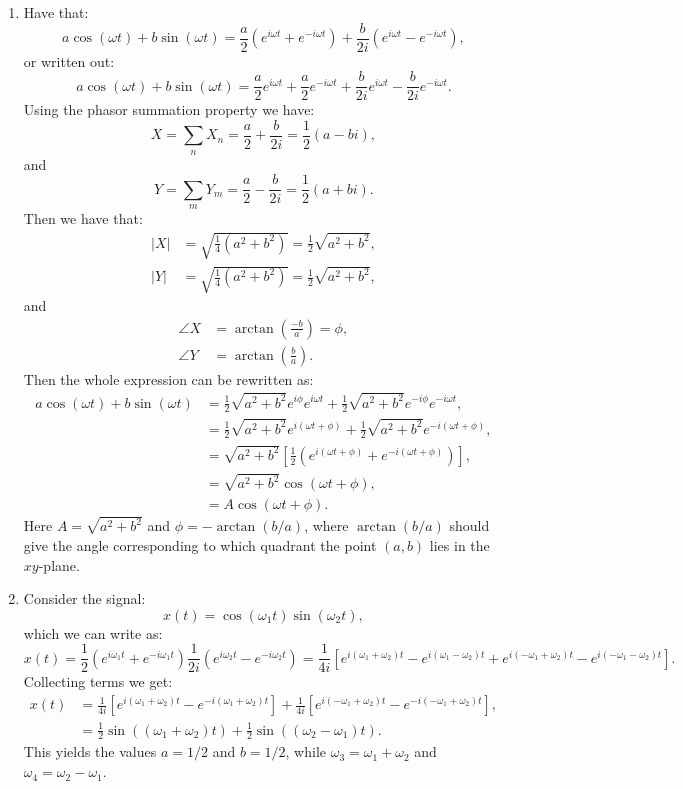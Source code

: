\begin{enumerate}
\item Have that:
$$a\cos(\omega t)+b\sin(\omega t)=\frac{a}{2}(e^{i\omega t}+e^{-i\omega t})+\frac{b}{2i}(e^{i\omega t}-e^{-i\omega t}),$$
or written out:
$$a\cos(\omega t)+b\sin(\omega t)=\frac{a}{2}e^{i\omega t}+\frac{a}{2}e^{-i\omega t}+\frac{b}{2i}e^{i\omega t}-\frac{b}{2i}e^{-i\omega t}.$$
Using the phasor summation property we have:
$$X=\sum_{n}X_{n}=\frac{a}{2}+\frac{b}{2i}=\frac{1}{2}(a-bi),$$
and
$$Y=\sum_{m}Y_{m}=\frac{a}{2}-\frac{b}{2i}=\frac{1}{2}(a+bi).$$
Then we have that:
\begin{align*}
    |X|&=\sqrt{\frac{1}{4}(a^{2}+b^{2})}=\frac{1}{2}\sqrt{a^{2}+b^{2}}, \\
    |Y|&=\sqrt{\frac{1}{4}(a^{2}+b^{2})}=\frac{1}{2}\sqrt{a^{2}+b^{2}},
\end{align*}
and
\begin{align*}
    \angle X&=\arctan\left(\frac{-b}{a}\right)=\phi, \\
    \angle Y&=\arctan\left(\frac{b}{a}\right).
\end{align*}
Then the whole expression can be rewritten as:
\begin{align*}
    a\cos(\omega t)+b\sin(\omega t)&=\frac{1}{2}\sqrt{a^{2}+b^{2}}e^{i\phi}e^{i\omega t}+\frac{1}{2}\sqrt{a^{2}+b^{2}}e^{-i\phi}e^{-i\omega t}, \\
    &=\frac{1}{2}\sqrt{a^{2}+b^{2}}e^{i(\omega t+\phi)}+\frac{1}{2}\sqrt{a^{2}+b^{2}}e^{-i(\omega t+\phi)}, \\
    &=\sqrt{a^{2}+b^{2}}\left[\frac{1}{2}\left(e^{i(\omega t+\phi)}+e^{-i(\omega t+\phi)}\right)\right], \\
    &=\sqrt{a^{2}+b^{2}}\cos(\omega t+\phi), \\
    &=A\cos(\omega t+\phi).
\end{align*}
Here $A=\sqrt{a^{2}+b^{2}}$ and $\phi=-\arctan(b/a)$, where $\arctan(b/a)$ 
should give the angle corresponding to which quadrant the point $(a,b)$ lies in the $xy$-plane. 

\item Consider the signal:
$$x(t)=\cos(\omega_{1}t)\sin(\omega_{2}t),$$
which we can write as:
$$x(t)=\frac{1}{2}(e^{i\omega_{1}t}+e^{-i\omega_{1} t})\frac{1}{2i}(e^{i\omega_{2}t}-e^{-i\omega_{2}t})=\frac{1}{4i}[e^{i(\omega_{1}+\omega_{2})t}-e^{i(\omega_{1}-\omega_{2})t}+e^{i(-\omega_{1}+\omega_{2})t}-e^{i(-\omega_{1}-\omega_{2})t}].$$
Collecting terms we get:
\begin{align*}
    x(t)&=\frac{1}{4i}[e^{i(\omega_{1}+\omega_{2})t}-e^{-i(\omega_{1}+\omega_{2})t}]+\frac{1}{4i}[e^{i(-\omega_{1}+\omega_{2})t}-e^{-i(-\omega_{1}+\omega_{2})t}], \\
    &=\frac{1}{2}\sin((\omega_{1}+\omega_{2})t)+\frac{1}{2}\sin((\omega_{2}-\omega_{1})t).
\end{align*}
This yields the values $a=1/2$ and $b=1/2$, while $\omega_{3}=\omega_{1}+\omega_{2}$ and $\omega_{4}=\omega_{2}-\omega_{1}$. 


\end{enumerate}
